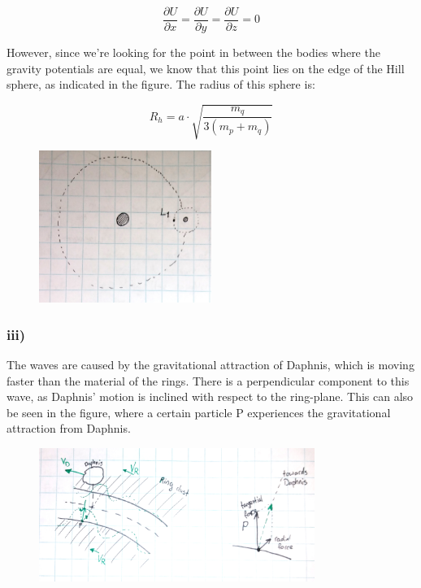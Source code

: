 \begin{equation}
        \frac{\partial U}{\partial x} = \frac{\partial U}{\partial y} = \frac{\partial U}{\partial z} = 0
\end{equation}

However, since we're looking for the point in between the bodies where the gravity potentials are equal, we know that this point lies on the edge of the Hill sphere, as indicated in the figure. The radius of this sphere is:

\begin{equation}
    R_h = a \cdot \sqrt{\frac{m_q}{3(m_p+m_q)}}
\end{equation}

\begin{figure}[H]
    \centering
    \includegraphics[width=0.5\textwidth]{figures/1b.jpg}
    \label{fig:my_label}
\end{figure}


\subsubsection*{iii)}
The waves are caused by the gravitational attraction of Daphnis, which is moving faster than the material of the rings. There is a perpendicular component to this wave, as Daphnis' motion is inclined with respect to the ring-plane. This can also be seen in the figure, where a certain particle P experiences the gravitational attraction from Daphnis.

\begin{figure}[H]
    \centering
    \includegraphics[width=0.8\textwidth]{figures/1biii.jpg}
    \label{fig:my_label3}
\end{figure}

